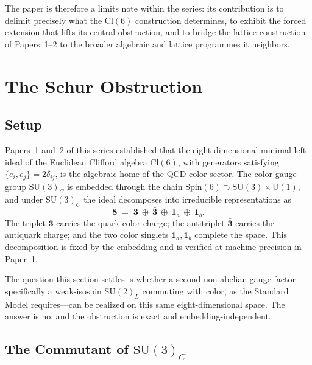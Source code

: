 \documentclass[12pt]{article}
\theoremstyle{remark}
\newcommand{\cl}{\mathrm{Cl}}
\newcommand{\spin}{\mathrm{Spin}}
\newcommand{\su}{\mathrm{SU}}
\newcommand{\UU}{\mathrm{U}}
\begin{document}
The paper is therefore a limits note within the series: its contribution is to
delimit precisely what the $\cl(6)$ construction determines, to exhibit the
forced extension that lifts its central obstruction, and to bridge the lattice
construction of Papers~1--2 to the broader algebraic and lattice programmes it
neighbors.

\section{The Schur Obstruction}
\label{sec:schur}

\subsection{Setup}
\label{sec:schur-setup}

Papers~1 and~2 of this series established that the eight-dimensional minimal
left ideal of the Euclidean Clifford algebra $\cl(6)$, with generators
satisfying $\{e_i,e_j\}=2\delta_{ij}$, is the algebraic home of the QCD color
sector.  The color gauge group $\su(3)_C$ is embedded through the chain
$\spin(6)\supset\su(3)\times\UU(1)$, and under $\su(3)_C$ the ideal decomposes
into irreducible representations as
\begin{equation}
	\mathbf{8} \;=\; \mathbf{3}\ \oplus\ \bar{\mathbf{3}}\ \oplus\
	\mathbf{1}_a\ \oplus\ \mathbf{1}_b.
	\label{eq:decomp}
\end{equation}
The triplet $\mathbf{3}$ carries the quark color charge; the antitriplet
$\bar{\mathbf{3}}$ carries the antiquark charge; and the two color singlets
$\mathbf{1}_a,\mathbf{1}_b$ complete the space.  This decomposition is fixed by
the embedding and is verified at machine precision in Paper~1.

The question this section settles is whether a second non-abelian gauge factor
---specifically a weak-isospin $\su(2)_L$ commuting with color, as the Standard
Model requires---can be realized on this same eight-dimensional space.  The
answer is no, and the obstruction is exact and embedding-independent.

\subsection{The Commutant of \texorpdfstring{$\su(3)_C$}{SU(3)\_C}}
\label{sec:commutant}
\end{document}
